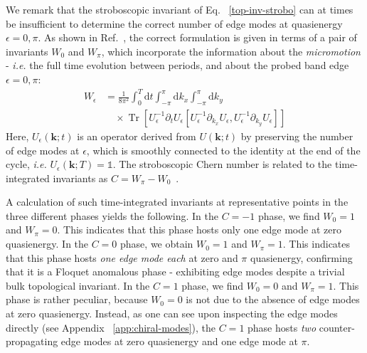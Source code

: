 \documentclass[aps,prb,twocolumn,superscriptaddress,groupedaddress]{revtex4}
\DeclareMathOperator{\Tr}{Tr}
\begin{document}
We remark that the stroboscopic invariant of Eq. ~\eqref{top-inv-strobo} can at times be insufficient to determine the correct number of edge modes at quasienergy $\epsilon=0,\pi$.
As shown in Ref.~\cite{Rudner:2013}, the correct formulation is given in terms of a pair of invariants $W_0$ and $W_{\pi}$, which incorporate the information about the \emph{micromotion} - \textit{i.e.} the full time evolution between periods, and about the probed band edge $\epsilon=0,\pi$:
%
\begin{align}
W_{\epsilon} &= \frac{1}{8 \pi^2} \int_0^T \mathrm{d}t \int_{-\pi}^{\pi} \mathrm{d} k_x  \int_{-\pi}^{\pi} \mathrm{d} k_y \nonumber \\
& \quad \times \Tr\left[ U_{\epsilon}^{-1} \partial_t U_{\epsilon} \left[ U_{\epsilon}^{-1} \partial_{k_x} U_{\epsilon}, U_{\epsilon}^{-1} \partial_{k_y} U_{\epsilon}\right]  \right]
\label{time-dep-top-inv}
\end{align}
%
Here, $U_{\epsilon}(\mathbf{k}; t)$ is an operator derived from $U(\mathbf{k}; t)$ by preserving the number of edge modes at $\epsilon$, which is smoothly connected to the identity at the end of the cycle, \textit{i.e.} $U_{\epsilon}(\mathbf{k}; T)=\mathds{1}$.
The stroboscopic Chern number is related to the time-integrated invariants as $C = W_{\pi} - W_0$~\cite{Rudner:2013, Yao:2017, Zhang:2020}.

A calculation of such time-integrated invariants at representative points in the three different phases yields the following.
In the $C=-1$ phase, we find $W_0=1$ and $W_{\pi}=0$. 
This indicates that this phase hosts only one edge mode at zero quasienergy.
In the $C=0$ phase, we obtain $W_0=1$ and $W_{\pi}=1$.
This indicates that this phase hosts \emph{one edge mode each} at zero and $\pi$ quasienergy, confirming that it is a Floquet anomalous phase - exhibiting edge modes despite a trivial bulk topological invariant.
In the $C=1$ phase, we find $W_0=0$ and $W_{\pi}=1$.
This phase is rather peculiar, because $W_0=0$ is not due to the absence of edge modes at zero quasienergy. 
Instead, as one can see upon inspecting the edge modes directly (see Appendix ~\ref{app:chiral-modes}), the $C=1$ phase hosts \emph{two} counter-propagating edge modes at zero quasienergy and one edge mode at $\pi$.

\end{document}
